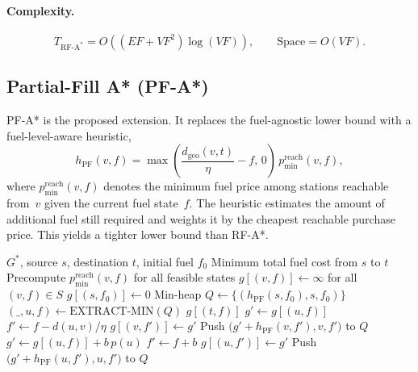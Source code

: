 \paragraph{Complexity.}
\[
T_{\mathrm{RF\text{-}A^{*}}}=O\!\left((EF+VF^{2})\log(VF)\right),
\qquad
\text{Space}=O(VF).
\]

\subsection{Partial-Fill A* (PF-A*)}
\label{subsec:pfastar}

PF-A* is the proposed extension. It replaces the fuel-agnostic lower bound with a fuel-level-aware heuristic,
\[
h_{\mathrm{PF}}(v,f)=\max\!\left(\frac{d_{\mathrm{geo}}(v,t)}{\eta}-f,\,0\right)\,p_{\min}^{\mathrm{reach}}(v,f),
\]
where $p_{\min}^{\mathrm{reach}}(v,f)$ denotes the minimum fuel price among stations reachable from~$v$ given the current fuel state~$f$. The heuristic estimates the amount of additional fuel still required and weights it by the cheapest reachable purchase price. This yields a tighter lower bound than RF-A*.

\begin{algorithm}[H]
\caption{PF-A* Search for Fuel-Aware Routing}
\label{alg:pfastar}
\begin{algorithmic}[1]
\Require $G^{*}$, source $s$, destination $t$, initial fuel $f_0$
\Ensure Minimum total fuel cost from $s$ to $t$
\State Precompute $p_{\min}^{\mathrm{reach}}(v,f)$ for all feasible states
\State $g[(v,f)] \gets \infty$ for all $(v,f)\in S$
\State $g[(s,f_0)] \gets 0$
\State Min-heap $Q \gets \{(h_{\mathrm{PF}}(s,f_0), s, f_0)\}$
    \State $(\_,u,f) \gets \mathrm{EXTRACT\text{-}MIN}(Q)$
        \State \Return $g[(t,f)]$
    \EndIf
        \State $g' \gets g[(u,f)]$
        \State $f' \gets f-d(u,v)/\eta$
            \State $g[(v,f')] \gets g'$
            \State Push $\bigl(g'+h_{\mathrm{PF}}(v,f'), v, f'\bigr)$ to $Q$
        \EndIf
    \EndFor
        \State $g' \gets g[(u,f)] + b\,p(u)$
        \State $f' \gets f+b$
            \State $g[(u,f')] \gets g'$
            \State Push $\bigl(g'+h_{\mathrm{PF}}(u,f'), u, f'\bigr)$ to $Q$
        \EndIf
    \EndFor
\EndWhile
\end{algorithmic}
\end{algorithm}

